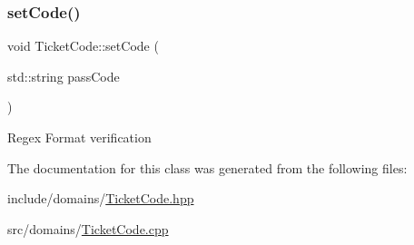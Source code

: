 \subsubsection{\texorpdfstring{setCode()}{setCode()}}
{\footnotesize\ttfamily void Ticket\+Code\+::set\+Code (\begin{DoxyParamCaption}\item[{std\+::string}]{pass\+Code }\end{DoxyParamCaption})}

Regex Format verification 

The documentation for this class was generated from the following files\+:\begin{DoxyCompactItemize}
\item 
include/domains/\mbox{\hyperlink{_ticket_code_8hpp}{Ticket\+Code.\+hpp}}\item 
src/domains/\mbox{\hyperlink{_ticket_code_8cpp}{Ticket\+Code.\+cpp}}\end{DoxyCompactItemize}
